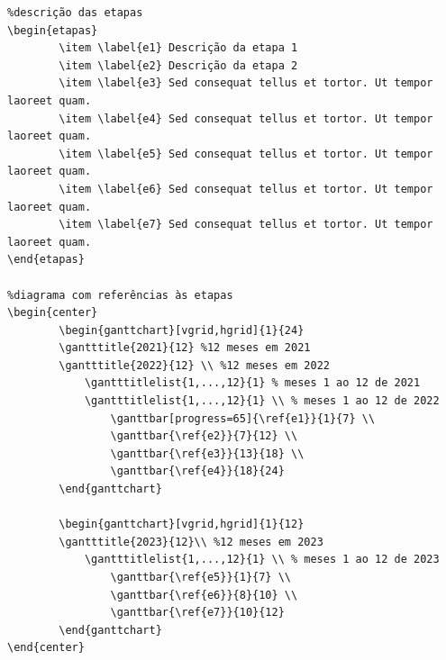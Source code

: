 \begin{verbatim}
%descrição das etapas
\begin{etapas}
    	\item \label{e1} Descrição da etapa 1
    	\item \label{e2} Descrição da etapa 2
    	\item \label{e3} Sed consequat tellus et tortor. Ut tempor laoreet quam.
    	\item \label{e4} Sed consequat tellus et tortor. Ut tempor laoreet quam. 
    	\item \label{e5} Sed consequat tellus et tortor. Ut tempor laoreet quam. 
    	\item \label{e6} Sed consequat tellus et tortor. Ut tempor laoreet quam. 
    	\item \label{e7} Sed consequat tellus et tortor. Ut tempor laoreet quam. 
\end{etapas}

%diagrama com referências às etapas
\begin{center}
        \begin{ganttchart}[vgrid,hgrid]{1}{24}
        \gantttitle{2021}{12} %12 meses em 2021
        \gantttitle{2022}{12} \\ %12 meses em 2022
            \gantttitlelist{1,...,12}{1} % meses 1 ao 12 de 2021
            \gantttitlelist{1,...,12}{1} \\ % meses 1 ao 12 de 2022
                \ganttbar[progress=65]{\ref{e1}}{1}{7} \\
                \ganttbar{\ref{e2}}{7}{12} \\
                \ganttbar{\ref{e3}}{13}{18} \\
                \ganttbar{\ref{e4}}{18}{24}
        \end{ganttchart}
        
        \begin{ganttchart}[vgrid,hgrid]{1}{12}
        \gantttitle{2023}{12}\\ %12 meses em 2023
            \gantttitlelist{1,...,12}{1} \\ % meses 1 ao 12 de 2023
                \ganttbar{\ref{e5}}{1}{7} \\
                \ganttbar{\ref{e6}}{8}{10} \\
                \ganttbar{\ref{e7}}{10}{12}
        \end{ganttchart}
\end{center}
\end{verbatim}



